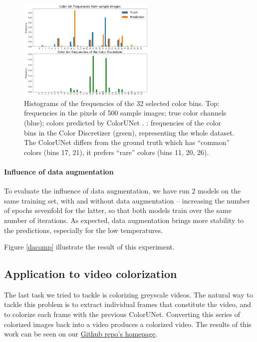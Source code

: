 \documentclass[10pt,twocolumn,letterpaper]{article}
\begin{document}
\begin{figure}
\begin{center}
\includegraphics[width=250px]{color_histogram}
\caption{Histograms of the frequencies of the 32 selected color bins. Top: frequencies in the pixels of 500 sample images; true color channels (blue); colors predicted by ColorUNet . : frequencies of the color bins in the Color Discretizer (green), representing the whole dataset. The ColorUNet differs from the ground truth which has ``common'' colors (bins 17, 21), it prefers ``rare'' colors (bins 11, 20, 26). }
\label{histogram}
\end{center}
\end{figure}


\paragraph{Influence of data augmentation}

To evaluate the influence of data augmentation, we have run 2 models on the same training set, with and without data augmentation -- increasing the number of epochs sevenfold for the latter, so that both models train over the same number of iterations. As expected, data augmentation brings more stability to the predictions, especially for the low temperatures.

Figure \ref{dacomp} illustrate the result of this experiment.

\subsection{Application to video colorization}

The last task we tried to tackle is colorizing greyscale videos. The natural way to tackle this problem is to extract individual frames that constitute the video, and to colorize each frame with the previous ColorUNet. Converting this series of colorized images back into a video produces a colorized video. The results of this work can be seen on our \href{https://github.com/vincentbillaut/all-colors-matter}{Github repo's homepage}.
\end{document}
